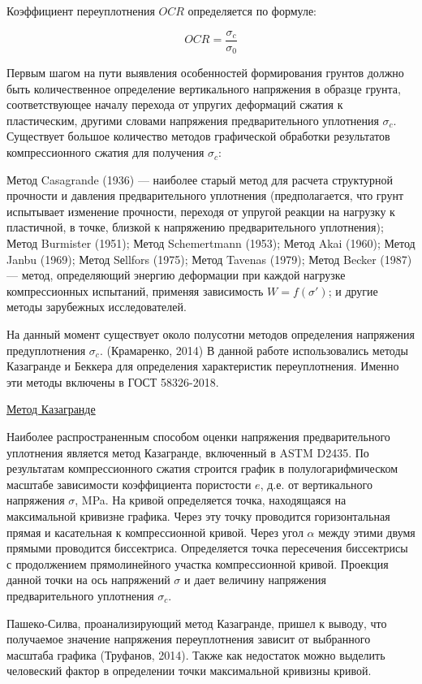 Коэффициент переуплотнения $OCR$ определяется по формуле:

\[
   OCR = \frac{\sigma_c}{\sigma_0}
\]

Первым шагом на пути выявления особенностей формирования грунтов должно быть количественное определение
вертикального напряжения в образце грунта, соответствующее началу перехода от упругих деформаций сжатия к пластическим,
другими словами напряжения предварительного уплотнения $\sigma_c$. 
Существует большое количество методов графической обработки 
результатов компрессионного сжатия для получения $\sigma_c$:

Метод Casagrande (1936) --- наиболее старый метод для расчета структурной 
прочности и давления предварительного уплотнения (предполагается, 
что грунт испытывает изменение прочности, переходя от упругой реакции на нагрузку 
к пластичной, в точке, близкой к напряжению предварительного уплотнения);
Метод Burmister (1951); Метод Schemertmann (1953); Метод Akai (1960);
Метод Janbu (1969); Метод Sеllfors (1975); Метод Tavenas (1979);
Метод Becker (1987) --- метод, определяющий энергию деформации
при каждой нагрузке компрессионных испытаний, применяя зависимость
\(W = f(\sigma')\); и другие методы зарубежных исследователей.
 
На данный момент существует около полусотни методов определения напряжения
предуплотнения $\sigma_c$. (Крамаренко, 2014)
В данной работе использовались методы Казагранде и Беккера для определения характеристик 
переуплотнения. Именно эти методы включены в ГОСТ 58326-2018.

\underline{Метод Казагранде}

Наиболее распространенным способом оценки напряжения предварительного 
уплотнения является метод Казагранде, включенный в ASTM D2435. 
По результатам компрессионного сжатия строится график в полулогарифмическом 
масштабе зависимости коэффициента пористости $e$, д.е. от 
вертикального напряжения $\sigma$, \si{\mega\pascal}. 
На кривой определяется точка, находящаяся на максимальной кривизне 
графика. Через эту точку проводится горизонтальная прямая 
и касательная к компрессионной кривой. 
Через угол $\alpha$ между этими двумя прямыми проводится биссектриса. 
Определяется точка пересечения биссектрисы с продолжением прямолинейного 
участка компрессионной кривой. Проекция данной точки на ось напряжений $\sigma$
и дает величину напряжения предварительного уплотнения $\sigma_c$.

Пашеко-Силва, проанализирующий метод Казагранде, пришел к выводу, 
что получаемое значение напряжения переуплотнения зависит от выбранного
масштаба графика (Труфанов, 2014). Также как недостаток можно выделить человеский 
фактор в определении точки максимальной кривизны кривой.


